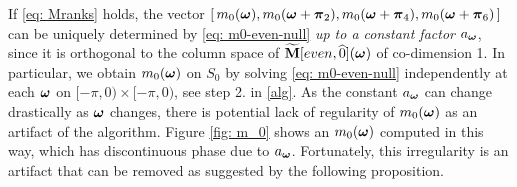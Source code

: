 If \eqref{eq: Mranks} holds, the vector $[\, m_0(\boldsymbol{\omega}),m_0(\boldsymbol{\omega}+\boldsymbol{\pi}_2), m_0(\boldsymbol{\omega} +\boldsymbol{\pi}_4), m_0(\boldsymbol{\omega}+\boldsymbol{\pi}_6) \,]$ can be uniquely determined by \eqref{eq: m0-even-null} {\it up to a constant factor $a_{\boldsymbol{\omega}} $}, since it is orthogonal to the column space of $\widetilde{\mathbf{M}}[even,\widehat{0}](\boldsymbol{\omega})$ of co-dimension 1. In particular, we obtain $m_0(\boldsymbol{\omega})$ on $S_0$ by solving \eqref{eq: m0-even-null} independently at each $\boldsymbol{\omega}$ on $[-\pi,0)\times[-\pi,0)$, see step 2. in \ref{alg}. As the constant $a_{\boldsymbol{\omega}}$ can change drastically as $\boldsymbol{\omega}$ changes, there is potential lack of regularity of $m_0(\boldsymbol{\omega})$ as an artifact of the algorithm. Figure \ref{fig: m_0} shows an $m_0(\boldsymbol{\omega})$ computed in this way, which has discontinuous phase due to $a_{\boldsymbol{\omega}}$. Fortunately, this irregularity is an artifact that can be removed as suggested by the following proposition.

